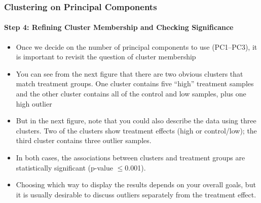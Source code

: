 \documentclass[10pt]{beamer}
\begin{document}
\begin{frame}[fragile]
\frametitle{Clustering on Principal Components}
\framesubtitle{Step 4: Refining Cluster Membership and Checking Significance}

{\footnotesize
\begin{itemize}

\item Once we decide on the number of principal components to use
  (PC1--PC3), it is important to revisit the question of cluster
  membership

\vspace*{1ex}  
\item You can see from the next figure that there are two obvious
  clusters that match treatment groups.  One cluster contains five
  ``high'' treatment samples and the other cluster contains all of the
  control and low samples, plus one high outlier

\vspace*{1ex}  
\item But in the next figure, note that you could also describe the
  data using three clusters.  Two of the clusters show treatment
  effects (high or control/low); the third cluster contains three
  outlier samples.

\vspace*{1ex}  
\item In both cases, the associations between clusters and treatment
  groups are statistically significant (p-value $\le$0.001).

\vspace*{1ex}  
\item Choosing which way to display the results depends on your
  overall goals, but it is usually desirable to discuss outliers
  separately from the treatment effect.

\end{itemize}
}
\end{frame}
\end{document}
